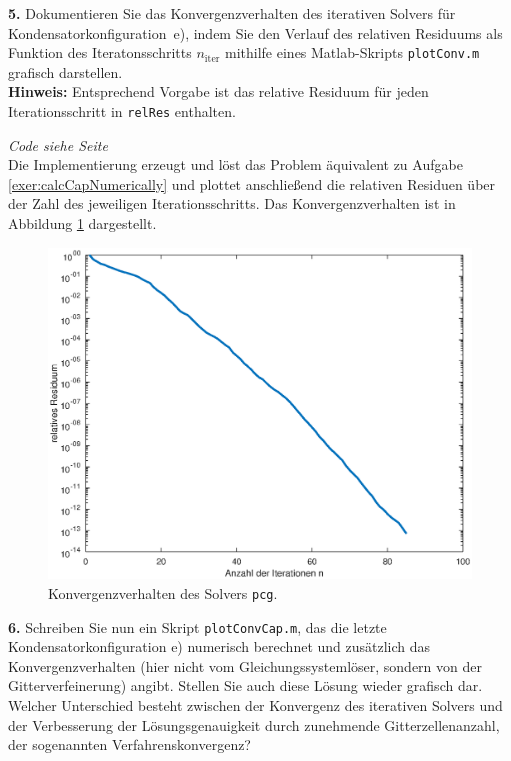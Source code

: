 \documentclass[./Protokollheft.tex]{subfiles}
\begin{document}
 \label{v4.PA.5}
\begin{framed}
	\noindent \textbf{5.}   Dokumentieren Sie das Konvergenzverhalten des iterativen Solvers für Kondensatorkonfiguration~e), indem Sie
den Verlauf des relativen Residuums als Funktion des Iteratonsschritts $n_\text{iter}$ mithilfe eines Matlab-Skripts \lstinline{plotConv.m} grafisch darstellen.\\
{\textbf{Hinweis:}} Entsprechend Vorgabe ist das relative Residuum für jeden Iterationsschritt in \lstinline{relRes} enthalten.\label{exer:plotCapConvSolver}
\end{framed}

\textit{ Code siehe Seite \pageref{code4.5} } \\
Die Implementierung erzeugt und löst das Problem äquivalent zu Aufgabe \ref{exer:calcCapNumerically} und plottet anschließend die relativen Residuen über der Zahl des jeweiligen Iterationsschritts. Das Konvergenzverhalten ist in Abbildung \ref{fig:V4.PA5} dargestellt.
\begin{figure}[p]
\begin{center}
\includegraphics[scale=0.7]{eps/plotConv}
\end{center}
\caption{Konvergenzverhalten des Solvers \lstinline{pcg}.}
\label{fig:V4.PA5}
\end{figure}

 \label{v4.PA.6}
\begin{framed}
	\noindent \textbf{6.} Schreiben Sie nun ein Skript \lstinline{plotConvCap.m}, das die letzte Kondensatorkonfiguration e) numerisch berechnet
und zusätzlich das Konvergenzverhalten (hier nicht vom Gleichungssystemlöser, sondern von der Gitterverfeinerung)
angibt. Stellen Sie auch diese Lösung wieder grafisch dar.\\
Welcher Unterschied besteht zwischen der Konvergenz des iterativen Solvers und der Verbesserung der Lösungsgenauigkeit durch zunehmende Gitterzellenanzahl, der sogenannten Verfahrenskonvergenz?\label{exer:plotCapConvMesh}
\end{framed}
\end{document}
